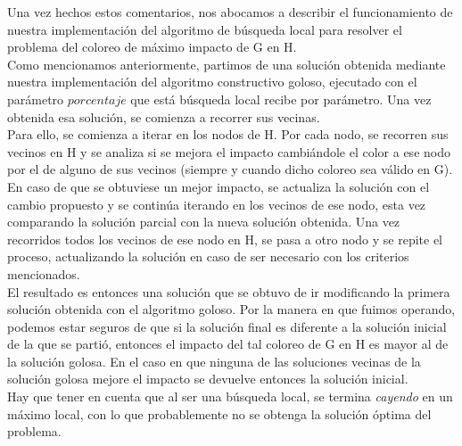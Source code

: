 \indent Una vez hechos estos comentarios, nos abocamos a describir el funcionamiento de nuestra implementación del algoritmo de búsqueda local para resolver el problema del coloreo de máximo impacto de G en H.\\
\indent Como mencionamos anteriormente, partimos de una solución obtenida mediante nuestra implementación del algoritmo constructivo goloso, ejecutado con el parámetro $porcentaje$ que está búsqueda local recibe por parámetro. Una vez obtenida esa solución, se comienza a recorrer sus vecinas.\\
\indent Para ello, se comienza a iterar en los nodos de H. Por cada nodo, se recorren sus vecinos en H y se analiza si se mejora el impacto cambiándole el color a ese nodo por el de alguno de sus vecinos (siempre y cuando dicho coloreo sea válido en G). En caso de que se obtuviese un mejor impacto, se actualiza la solución con el cambio propuesto y se continúa iterando en los vecinos de ese nodo, esta vez comparando la solución parcial con la nueva solución obtenida. Una vez recorridos todos los vecinos de ese nodo en H, se pasa a otro nodo y se repite el proceso, actualizando la solución en caso de ser necesario con los criterios mencionados.\\
\indent El resultado es entonces una solución que se obtuvo de ir modificando la primera solución obtenida con el algoritmo goloso. Por la manera en que fuimos operando, podemos estar seguros de que si la solución final es diferente a la solución inicial de la que se partió, entonces el impacto del tal coloreo de G en H es mayor al de la solución golosa. En el caso en que ninguna de las soluciones vecinas de la solución golosa mejore el impacto se devuelve entonces la solución inicial.\\
\indent Hay que tener en cuenta que al ser una búsqueda local, se termina \textit{cayendo} en un máximo local, con lo que probablemente no se obtenga la solución óptima del problema.


